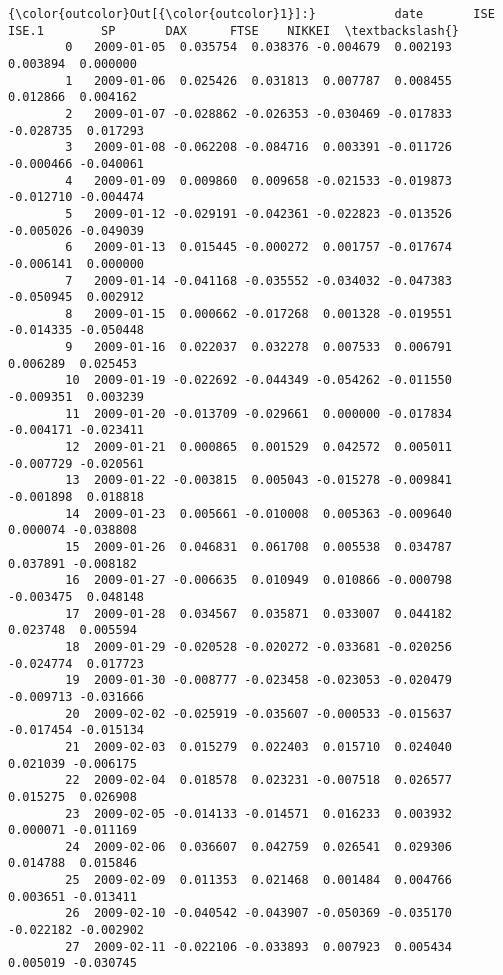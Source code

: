 \documentclass[11pt]{article}
\begin{document}
\begin{Verbatim}[commandchars=\\\{\}]
{\color{outcolor}Out[{\color{outcolor}1}]:}           date       ISE     ISE.1        SP       DAX      FTSE    NIKKEI  \textbackslash{}
        0   2009-01-05  0.035754  0.038376 -0.004679  0.002193  0.003894  0.000000   
        1   2009-01-06  0.025426  0.031813  0.007787  0.008455  0.012866  0.004162   
        2   2009-01-07 -0.028862 -0.026353 -0.030469 -0.017833 -0.028735  0.017293   
        3   2009-01-08 -0.062208 -0.084716  0.003391 -0.011726 -0.000466 -0.040061   
        4   2009-01-09  0.009860  0.009658 -0.021533 -0.019873 -0.012710 -0.004474   
        5   2009-01-12 -0.029191 -0.042361 -0.022823 -0.013526 -0.005026 -0.049039   
        6   2009-01-13  0.015445 -0.000272  0.001757 -0.017674 -0.006141  0.000000   
        7   2009-01-14 -0.041168 -0.035552 -0.034032 -0.047383 -0.050945  0.002912   
        8   2009-01-15  0.000662 -0.017268  0.001328 -0.019551 -0.014335 -0.050448   
        9   2009-01-16  0.022037  0.032278  0.007533  0.006791  0.006289  0.025453   
        10  2009-01-19 -0.022692 -0.044349 -0.054262 -0.011550 -0.009351  0.003239   
        11  2009-01-20 -0.013709 -0.029661  0.000000 -0.017834 -0.004171 -0.023411   
        12  2009-01-21  0.000865  0.001529  0.042572  0.005011 -0.007729 -0.020561   
        13  2009-01-22 -0.003815  0.005043 -0.015278 -0.009841 -0.001898  0.018818   
        14  2009-01-23  0.005661 -0.010008  0.005363 -0.009640  0.000074 -0.038808   
        15  2009-01-26  0.046831  0.061708  0.005538  0.034787  0.037891 -0.008182   
        16  2009-01-27 -0.006635  0.010949  0.010866 -0.000798 -0.003475  0.048148   
        17  2009-01-28  0.034567  0.035871  0.033007  0.044182  0.023748  0.005594   
        18  2009-01-29 -0.020528 -0.020272 -0.033681 -0.020256 -0.024774  0.017723   
        19  2009-01-30 -0.008777 -0.023458 -0.023053 -0.020479 -0.009713 -0.031666   
        20  2009-02-02 -0.025919 -0.035607 -0.000533 -0.015637 -0.017454 -0.015134   
        21  2009-02-03  0.015279  0.022403  0.015710  0.024040  0.021039 -0.006175   
        22  2009-02-04  0.018578  0.023231 -0.007518  0.026577  0.015275  0.026908   
        23  2009-02-05 -0.014133 -0.014571  0.016233  0.003932  0.000071 -0.011169   
        24  2009-02-06  0.036607  0.042759  0.026541  0.029306  0.014788  0.015846   
        25  2009-02-09  0.011353  0.021468  0.001484  0.004766  0.003651 -0.013411   
        26  2009-02-10 -0.040542 -0.043907 -0.050369 -0.035170 -0.022182 -0.002902   
        27  2009-02-11 -0.022106 -0.033893  0.007923  0.005434  0.005019 -0.030745   

\end{Verbatim}
\end{document}
